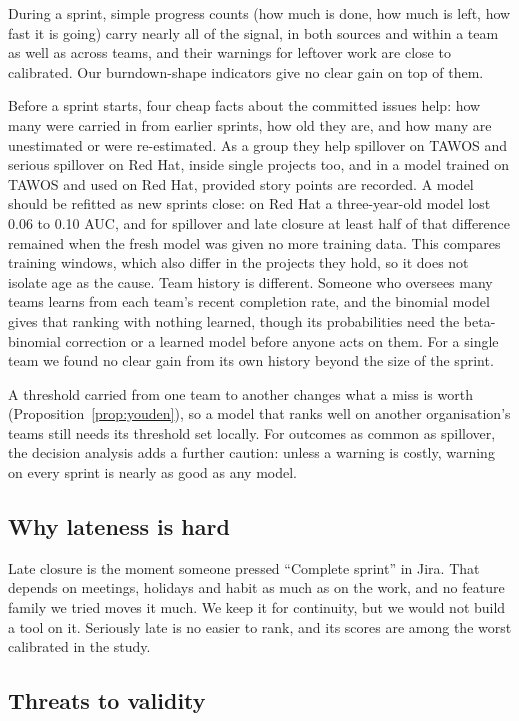 During a sprint, simple progress counts (how much is done, how much is left, how fast it is going) carry nearly all of the signal, in both sources and within a team as well as across teams, and their warnings for leftover work are close to calibrated. Our burndown-shape indicators give no clear gain on top of them.

Before a sprint starts, four cheap facts about the committed issues help: how many were carried in from earlier sprints, how old they are, and how many are unestimated or were re-estimated. As a group they help spillover on TAWOS and serious spillover on Red Hat, inside single projects too, and in a model trained on TAWOS and used on Red Hat, provided story points are recorded. A model should be refitted as new sprints close: on Red Hat a three-year-old model lost 0.06 to 0.10 AUC, and for spillover and late closure at least half of that difference remained when the fresh model was given no more training data. This compares training windows, which also differ in the projects they hold, so it does not isolate age as the cause. Team history is different. Someone who oversees many teams learns from each team's recent completion rate, and the binomial model gives that ranking with nothing learned, though its probabilities need the beta-binomial correction or a learned model before anyone acts on them. For a single team we found no clear gain from its own history beyond the size of the sprint.

A threshold carried from one team to another changes what a miss is worth (Proposition~\ref{prop:youden}), so a model that ranks well on another organisation's teams still needs its threshold set locally. For outcomes as common as spillover, the decision analysis adds a further caution: unless a warning is costly, warning on every sprint is nearly as good as any model.

\subsection{Why lateness is hard}

Late closure is the moment someone pressed ``Complete sprint'' in Jira. That depends on meetings, holidays and habit as much as on the work, and no feature family we tried moves it much. We keep it for continuity, but we would not build a tool on it. Seriously late is no easier to rank, and its scores are among the worst calibrated in the study.

\subsection{Threats to validity}
\label{sec:threats}

